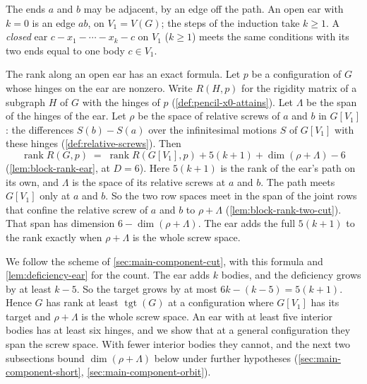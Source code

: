 The ends $a$ and $b$ may be adjacent, by an edge off the path. An open
ear with $k = 0$ is an edge $ab$, on $V_1 = V(G)$; the steps of the
induction take $k \ge 1$. A \emph{closed} ear
$c - x_1 - \cdots - x_k - c$ on $V_1$ ($k \ge 1$) meets the same
conditions with its two ends equal to one body $c \in V_1$.

The rank along an open ear has an exact formula. Let $p$ be a
configuration of $G$ whose hinges on the ear are nonzero. Write
$R(H, p)$ for the rigidity matrix of a subgraph $H$ of $G$ with the
hinges of $p$ (\cref{def:pencil-x0-attains}). Let $\Lambda$ be the span
of the hinges of the ear. Let $\rho$ be the space of relative screws of
$a$ and $b$ in $G[V_1]$: the differences $S(b) - S(a)$ over the
infinitesimal motions $S$ of $G[V_1]$ with these hinges
(\cref{def:relative-screws}). Then
\[
  \operatorname{rank} R(G, p) \;=\; \operatorname{rank} R(G[V_1], p)
  + 5(k + 1) + \dim(\rho + \Lambda) - 6
\]
(\cref{lem:block-rank-ear}, at $D = 6$). Here $5(k + 1)$ is the rank of
the ear's path on its own, and $\Lambda$ is the space of its relative
screws at $a$ and $b$. The path meets $G[V_1]$ only at $a$ and $b$. So
the two row spaces meet in the span of the joint rows that confine the
relative screw of $a$ and $b$ to $\rho + \Lambda$
(\cref{lem:block-rank-two-cut}). That span has dimension
$6 - \dim(\rho + \Lambda)$. The ear adds the full $5(k + 1)$ to the rank
exactly when $\rho + \Lambda$ is the whole screw space.

We follow the scheme of \cref{sec:main-component-cut}, with this formula
and \cref{lem:deficiency-ear} for the count. The ear adds $k$ bodies, and
the deficiency grows by at least $k - 5$. So the target grows by at most
$6k - (k - 5) = 5(k + 1)$. Hence $G$ has rank at least
$\operatorname{tgt}(G)$ at a configuration where $G[V_1]$ has its target
and $\rho + \Lambda$ is the whole screw space. An ear with at least five
interior bodies has at least six hinges, and we show that at a general
configuration they span the screw space. With fewer interior bodies they
cannot, and the next two subsections bound $\dim(\rho + \Lambda)$ below
under further hypotheses (\cref{sec:main-component-short},
\cref{sec:main-component-orbit}).

